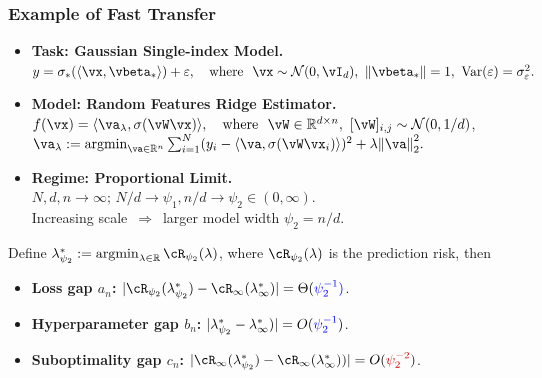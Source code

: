 \begin{frame}
\frametitle{Example of Fast Transfer}
\vspace{1.5mm}

{\small
\begin{itemize}\setlength\itemsep{0.42em} 
    \item \textbf{\colorbox{teal!12}{Task}: Gaussian Single-index Model.} 
    {\color{lightgray!60!black} $y = \sigma_*(\langle\vx,\vbeta_*\rangle) + \varepsilon, \quad \text{where~ } \vx\sim\mathcal{N}(0,\vI_d), ~ \norm{\vbeta_*}=1, ~\mathrm{Var}(\varepsilon) = \sigma_\varepsilon^2.$}
    \item \textbf{\colorbox{teal!12}{Model}: Random Features Ridge Estimator.} 
    {\color{lightgray!60!black} $f(\vx) = \langle\va_\lambda, \sigma(\vW\vx)\rangle, 
    \quad \text{where~ } \vW\in\R^{d\times n}, ~
    [\vW]_{i,j}\sim \mathcal{N}(0,1/d)$,  
    $\textstyle\va_\lambda := \mathrm{argmin}_{\va\in\R^n} \sum_{i=1}^N (y_i - \langle\va, \sigma(\vW\vx_i)\rangle)^2 + \lambda\norm{\va}_2^2.$}
    \item \textbf{\colorbox{teal!12}{Regime}: Proportional Limit.} $N,d,n\to\infty;\, N/d\to\psi_1, n/d\to\psi_2\in (0,\infty)$. \\
    {\color{lightgray!60!black} Increasing scale $\,\Rightarrow\,$ larger model width $\psi_2 = n/d$. }
\end{itemize}
}

\vspace{2.5mm}
\pause

\begin{prop}

Define $\lambda^*_{\psi_2} := \argmin_{\lambda\in\R} \cR_{\psi_2}(\lambda)$, where $\cR_{\psi_2}(\lambda)$ is the prediction risk, then
\begin{itemize}\setlength\itemsep{0.36em} 
    \item[\ding{112}] \textbf{Loss gap {\color{FlatironOrange2!90!black}$a_n$}:} $|{\cR_{\psi_2}(\lambda^*_{\psi_2}) - \cR_{\infty}(\lambda^*_{\infty})}| = \Theta({\color{blue}\psi_2^{-1})}$. 
    \item[\ding{112}] \textbf{Hyperparameter gap {\color{FlatironOrange2!90!black}$b_n$}:} $|{\lambda^*_{\psi_2} - \lambda^*_{\infty})}| = O({\color{blue}\psi_2^{-1}})$.  \pause
    \item[\ding{112}] \textbf{Suboptimality gap {\color{FlatironOrange2!90!black}$c_n$}:} $|{\cR_\infty(\lambda^*_{\psi_2}) - \cR_\infty(\lambda^*_{\infty}))}| = O({\color{red!80!black}\psi_2^{-2}})$. 
\end{itemize}

\end{prop} 


\end{frame}  


